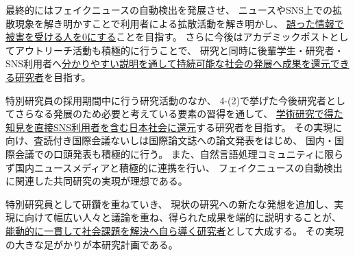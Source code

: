 最終的にはフェイクニュースの自動検出を発展させ、
ニュースやSNS上での拡散現象を解き明かすことで利用者による拡散活動を解き明かし、
\underline{誤った情報で被害を受ける人を0にする}ことを目指す。
さらに今後はアカデミックポストとしてアウトリーチ活動も積極的に行うことで、
研究と同時に後輩学生・研究者・SNS利用者へ\underline{分かりやすい説明を通して持続可能な社会の発展へ成果を還元できる研究者}を目指す。


\vspace{5mm}
\noindent
{}

特別研究員の採用期間中に行う研究活動のなか、
4-(2)で挙げた今後研究者としてさらなる発展のため必要と考えている要素の習得を通して、
\underline{学術研究で得た知見を直接SNS利用者を含む日本社会に還元}する研究者を目指す。
その実現に向け、査読付き国際会議ないしは国際論文誌への論文発表をはじめ、
国内・国際会議での口頭発表も積極的に行う。
また、自然言語処理コミュニティに限らず国内ニュースメディアと積極的に連携を行い、
フェイクニュースの自動検出に関連した共同研究の実現が理想である。

特別研究員として研鑽を重ねていき、
現状の研究への新たな発想を追加し、実現に向けて幅広い人々と議論を重ね、得られた成果を端的に説明することが、
\underline{能動的に一貫して社会課題を解決へ自ら導く研究者}として大成する。
その実現の大きな足がかりが本研究計画である。



